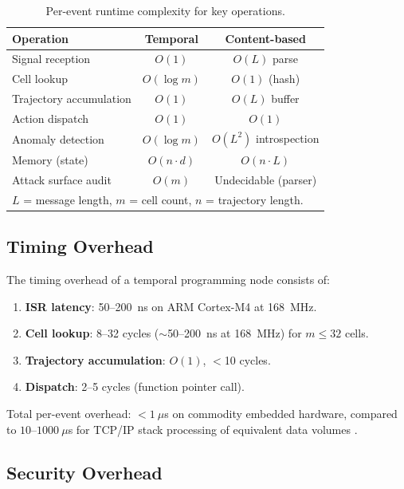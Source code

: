 \documentclass[twocolumn,10pt]{article}
\begin{document}
\begin{table}[ht]
\centering
\caption{Per-event runtime complexity for key operations.}
\label{tab:complexity}
\small
\begin{tabular}{@{}lcc@{}}
\toprule
\textbf{Operation} & \textbf{Temporal} & \textbf{Content-based} \\
\midrule
Signal reception       & $O(1)$         & $O(L)$ parse \\
Cell lookup            & $O(\log m)$    & $O(1)$ (hash) \\
Trajectory accumulation& $O(1)$         & $O(L)$ buffer \\
Action dispatch        & $O(1)$         & $O(1)$ \\
Anomaly detection      & $O(\log m)$    & $O(L^2)$ introspection \\
Memory (state)         & $O(n \cdot d)$ & $O(n \cdot L)$ \\
Attack surface audit   & $O(m)$         & Undecidable (parser) \\
\bottomrule
\multicolumn{3}{l}{$L$ = message length, $m$ = cell count, $n$ = trajectory length.}
\end{tabular}
\end{table}

\subsection{Timing Overhead}

The timing overhead of a temporal programming node consists of:
\begin{enumerate}[leftmargin=1.5em,topsep=2pt,itemsep=1pt]
  \item \textbf{ISR latency}: 50--200~ns on ARM Cortex-M4 at 168~MHz.
  \item \textbf{Cell lookup}: 8--32 cycles ($\sim$50--200~ns at 168~MHz)
    for $m \leq 32$ cells.
  \item \textbf{Trajectory accumulation}: $O(1)$, $<$10 cycles.
  \item \textbf{Dispatch}: 2--5 cycles (function pointer call).
\end{enumerate}
Total per-event overhead: $< 1~\mu$s on commodity embedded hardware,
compared to $10$--$1000~\mu$s for TCP/IP stack processing of
equivalent data volumes \cite{levis2005tinyos,zhao2007ptides}.

\subsection{Security Overhead}
\end{document}
